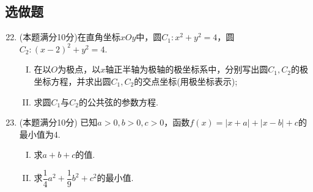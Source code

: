 \documentclass[11pt]{article}
\begin{document}
\subsection{\heiti 选做题}
\begin{enumerate}
	\setcounter{enumi}{21}
	\item \heiti [选修4-4：极坐标与参数方程]\songti (本题满分10分)在直角坐标$ xOy $中，圆$ C_1:x^2+y^2=4 $，圆$ C_2:(x-2)^2+y^2=4 $.
	\begin{enumerate}[(I)]
		\item 在以$ O $为极点，以$ x $轴正半轴为极轴的极坐标系中，分别写出圆$ C_1,C_2 $的极坐标方程，并求出圆$ C_1,C_2 $的交点坐标(用极坐标表示);
		\item 求圆$ C_1 $与$ C_2 $的公共弦的参数方程.
	\end{enumerate}
	\item \heiti [选修4-5：不等式选讲]\songti (本题满分10分) 已知$ a>0,b>0,c>0 $，函数$ f(x)=\left | x+a \right | +\left | x-b \right | +c $的最小值为4.
	\begin{enumerate}[(I)]
		\item 求$a+b+c$的值.
		\item 求$ \dfrac{1}{4}a^2+\dfrac{1}{9}b^2+c^2$的最小值.
	\end{enumerate}
\end{enumerate}
\end{document}
